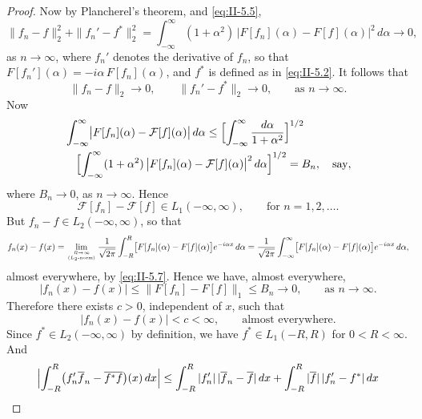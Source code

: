 \begin{proof}
Now by Plancherel's theorem, and \eqref{eq:II-5.5},
\[
\|f_{n}-f\|_{2}^{2}+\|f_{n}'-f^{*}\|_{2}^{2}
=\int_{-\infty}^{\infty}(1+\alpha^{2})\,
\bigl|F[f_{n}](\alpha)-F[f](\alpha)\bigr|^{2}\,d\alpha\to 0,
\]
as $n\to\infty$, where $f_{n}'$ denotes the derivative of $f_{n}$, so that $F[f_{n}'](\alpha)=-i\alpha\,F[f_{n}](\alpha)$, and $f^{*}$ is defined as in \eqref{eq:II-5.2}. It follows that
\begin{equation}\tag{5.6}\label{eq:II-5.6}
\|f_{n}-f\|_{2}\to 0,\qquad \|f_{n}'-f^{*}\|_{2}\to 0,\qquad\text{as }n\to\infty.
\end{equation}
Now
\[
\begin{aligned}
&\int_{-\infty}^{\infty}\bigl|F[f_{n}](\alpha)-\mathcal F[f](\alpha)\bigr|\,d\alpha
\le \Bigl[\int_{-\infty}^{\infty}\frac{d\alpha}{1+\alpha^{2}}\Bigr]^{1/2}\\
&\quad\Bigl[\int_{-\infty}^{\infty}(1+\alpha^{2})\,
\bigl|F[f_{n}](\alpha)-\mathcal F[f](\alpha)\bigr|^{2}\,d\alpha\Bigr]^{1/2}=B_{n},\quad\text{say},
\end{aligned}
\]
where $B_{n}\to 0$, as $n\to\infty$. Hence
\begin{equation}\tag{5.7}\label{eq:II-5.7}
\mathcal F[f_{n}]-\mathcal F[f]\in L_{1}(-\infty,\infty),\qquad\text{for }n=1,2,\dots.
\end{equation}
But $f_{n}-f\in L_{2}(-\infty,\infty)$, so that
\[
f_{n}(x)-f(x)=\lim_{R\to\infty\atop(L_{2}\text{-norm})}
\frac{1}{\sqrt{2\pi}}\int_{-R}^{R}\bigl[F[f_{n}](\alpha)-F[f](\alpha)\bigr]e^{-i\alpha x}\,d\alpha
=\frac{1}{\sqrt{2\pi}}\int_{-\infty}^{\infty}\bigl[F[f_{n}](\alpha)-F[f](\alpha)\bigr]e^{-i\alpha x}\,d\alpha,
\]
almost everywhere, by \eqref{eq:II-5.7}. Hence we have, almost everywhere,
\begin{equation}\tag{5.7'}\label{eq:II-5.7p}
|f_{n}(x)-f(x)|\le \|F[f_{n}]-F[f]\|_{1}\le B_{n}\to 0,\qquad\text{as }n\to\infty.
\end{equation}
Therefore there exists $c>0$, independent of $x$, such that
\begin{equation}\tag{5.8}\label{eq:II-5.8}
|f_{n}(x)-f(x)|<c<\infty,\qquad\text{almost everywhere}.
\end{equation}
Since $f^{*}\in L_{2}(-\infty,\infty)$ by definition, we have $f^{*}\in L_{1}(-R,R)$ for $0<R<\infty$. And
\[
\Bigl|\int_{-R}^{R}\bigl(f_{n}'\overline{f}_{n}-\overline{f^{*}}\overline{f}\bigr)(x)\,dx\Bigr|
\le\int_{-R}^{R}|f_{n}'|\,|\overline{f}_{n}-\overline{f}|\,dx
+\int_{-R}^{R}|\overline{f}|\,|f_{n}'-f^{*}|\,dx
\]
\begin{equation}\tag{5.9}\label{eq:II-5.9}

\end{equation}
\end{proof}

